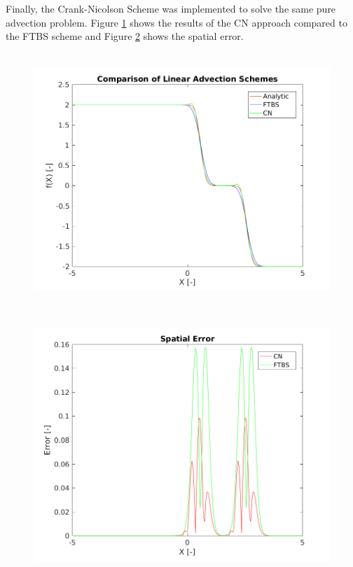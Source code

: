 \documentclass[12pt]{article}
\begin{document}
	Finally, the Crank-Nicolson Scheme was implemented to solve the same pure advection problem. Figure \ref{fig:ftbs_CN} shows the results of the CN approach compared to the FTBS scheme and Figure \ref{fig:ftbs_CN_error} shows the spatial error.
	
	\begin{figure}[H]
		\centering
		\includegraphics[height=3.75in]{ftbs_CN.png}
		\label{fig:ftbs_CN}
		\caption{}
	\end{figure}
	
	\begin{figure}[H]
		\centering
		\includegraphics[height=3.75in]{ftbs_CN_error.png}
		\label{fig:ftbs_CN_error}
		\caption{}
	\end{figure}
	





		
	
	
	
	
\end{document}
